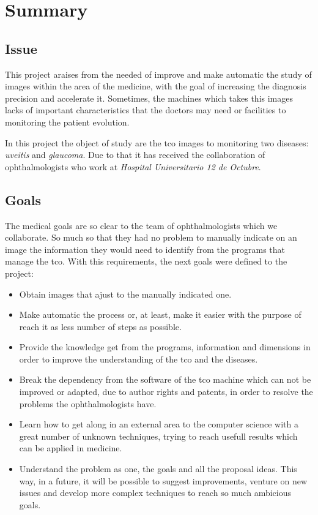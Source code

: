 \chapter{Summary}
\section{Issue}
This project araises from the needed of improve and make automatic the
study of images within the area of the medicine, with the goal of 
increasing the diagnosis precision and accelerate it. Sometimes, the
machines which takes this images lacks of important characteristics 
that the doctors may need or facilities to monitoring the patient evolution.

In this project the object of study are the \gls{tco} images to monitoring
two diseases: \emph{\gls{uveitis}} and \emph{\gls{glaucoma}}. Due to that
it has received the collaboration of ophthalmologists who work at
\emph{Hospital Universitario 12 de Octubre}.

\section{Goals}
The medical goals are so clear to the team of ophthalmologists which
we collaborate. So much so that they had no problem to manually indicate on an 
image the information they would need to identify from the programs that 
manage the \gls{tco}. With this requirements, the next goals were defined 
to the project:
\begin{itemize}
\item Obtain images that ajust to the manually indicated one.
\item Make automatic the process or, at least, make it easier with
the purpose of reach it as less number of steps as possible.
\item Provide the knowledge get from the programs, information and 
dimensions in order to improve the understanding of the \gls{tco} and
the diseases.
\item Break the dependency from the software of the \gls{tco} machine
which can not be improved or adapted, due to author rights and patents, 
in order to resolve the problems the ophthalmologists have.
\item Learn how to get along in an external area to the computer science
with a great number of unknown techniques, trying to reach usefull 
results which can be applied in medicine.
\item Understand the problem as one, the goals and all the proposal ideas.
This way, in a future, it will be possible to suggest improvements, venture
on new issues and develop more complex techniques to reach so much 
ambicious goals.
\end{itemize}

